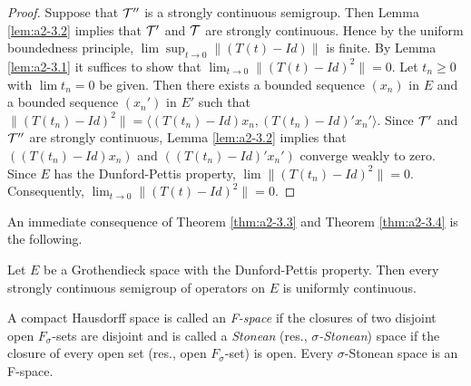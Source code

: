 \begin{proof}
Suppose that $\mathcal{T}''$ is a strongly continuous semigroup.
Then Lemma \ref{lem:a2-3.2}   implies that $\mathcal{T}'$ and $\mathcal{T}$ are strongly continuous.
Hence by the uniform boundedness principle, $\lim \sup_{t \to 0} \|(T(t) - Id)\|$ is finite.
By Lemma \ref{lem:a2-3.1}   it suffices to show that $\lim_{t \to 0} \|(T(t) - Id)^2\| = 0$.
Let $t_{n} \geq 0$ with $\lim t_{n} = 0$ be given.
Then there exists a bounded sequence $(x_{n})$ in $E$ and a bounded sequence $(x_{n}')$ in $E'$ such that $\|(T(t_{n}) - Id)^2\| = \langle (T(t_{n}) - Id)x_{n}, (T(t_{n}) - Id)'x_{n}' \rangle$.
Since $\mathcal{T}'$ and $\mathcal{T}''$ are strongly continuous, Lemma \ref{lem:a2-3.2}   implies that $((T(t_{n}) - Id)x_{n})$ and $((T(t_{n}) - Id)'x_{n}')$ converge weakly to zero.
Since $E$ has the Dunford-Pettis property, $\lim \|(T(t_{n}) - Id)^2\| = 0$.
Consequently, $\lim_{t \to 0} \|(T(t) - Id)^2\| = 0$.
\end{proof}

An immediate consequence of Theorem \ref{thm:a2-3.3}   and Theorem \ref{thm:a2-3.4}   is the following.

\begin{theorem}\label{thm:a2-3.5}
Let $E$ be a Grothendieck space with the Dunford-Pettis property.
Then every strongly continuous semigroup of operators on $E$ is uniformly continuous.
\end{theorem}
A compact Hausdorff space is called an \emph{F-space} if the closures of two disjoint open $F_{\sigma}$-sets are disjoint and is called a \emph{Stonean} (res., \emph{$\sigma$-Stonean}) space if the closure of every open set (res., open $F_{\sigma}$-set) is open.
Every $\sigma$-Stonean space is an F-space.

